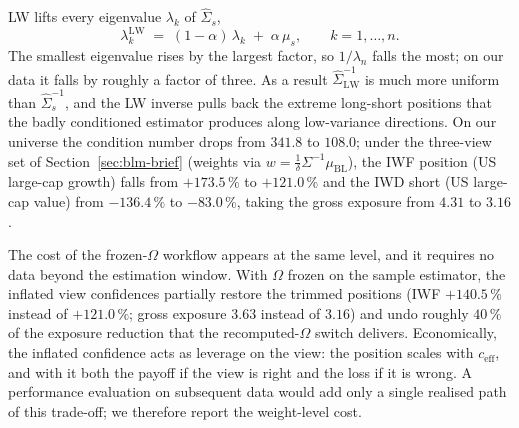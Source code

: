 \documentclass[a4paper,11pt]{article}
\theoremstyle{plain}
\theoremstyle{definition}
\newcommand{\muBL}{\mu_{\mathrm{BL}}}
\newcommand{\LW}{\mathrm{LW}}
\newcommand{\eff}{\mathrm{eff}}
\begin{document}
LW lifts every eigenvalue $\lambda_k$ of $\hat\Sigma_s$,
\[
    \lambda_k^{\LW} \;=\; (1-\alpha)\,\lambda_k \;+\; \alpha\,\mu_s,
    \qquad k = 1,\dots,n.
\]
The smallest eigenvalue rises by the largest factor, so $1/\lambda_n$
falls the most; on our data it falls by roughly a factor of three. As a
result $\hat\Sigma_{\LW}^{-1}$ is much more uniform than
$\hat\Sigma_s^{-1}$, and the LW inverse pulls back the extreme
long-short positions that the badly conditioned estimator produces
along low-variance directions. On our universe
the condition number drops from $341.8$ to $108.0$; under the three-view
set of Section~\ref{sec:blm-brief} (weights via
$w = \tfrac{1}{\delta}\Sigma^{-1}\muBL$), the IWF position (US
large-cap growth)
falls from $+173.5\,\%$ to $+121.0\,\%$ and the IWD short (US large-cap
value) from $-136.4\,\%$ to $-83.0\,\%$, taking the gross exposure from
$4.31$ to $3.16$.

The cost of the frozen-$\Omega$ workflow appears at the same level,
and it requires no data beyond the estimation window. With $\Omega$
frozen on the sample estimator, the inflated view confidences partially
restore the trimmed positions (IWF $+140.5\,\%$ instead of
$+121.0\,\%$; gross exposure $3.63$ instead of $3.16$) and undo roughly
$40\,\%$ of the exposure reduction that the recomputed-$\Omega$ switch
delivers. Economically, the inflated confidence acts as leverage on the
view: the position scales with $c_{\eff}$, and with it both the payoff
if the view is right and the loss if it is wrong. A performance
evaluation on subsequent data would add only a single realised path of
this trade-off; we therefore report the weight-level cost.
\end{document}
